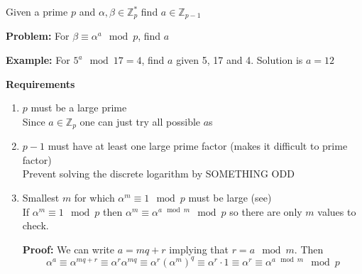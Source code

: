 

Given a prime $p$ and $\alpha, \beta \in \mathbb{Z}_p^*$ find $a \in \mathbb{Z}_{p-1}$

\textbf{Problem:} For $\beta \equiv \alpha^a \mod p$, find $a$

\textbf{Example:} For $5^a \mod 17 = 4$, find $a$ given 5, 17 and 4. Solution is $a = 12$

\textbf{Requirements}
\begin{enumerate}
\item $p$ must be a large prime\\
  Since $a \in \mathbb{Z}_p$ one can just try all possible $a$s

\item $p - 1$ must have at least one large prime factor (makes it difficult to prime factor)\\
  Prevent solving the discrete logarithm by SOMETHING ODD

\item Smallest $m$ for which $\alpha^m \equiv 1 \mod p$ must be large (see)\\
  If $\alpha^m \equiv 1 \mod p$ then $\alpha^m \equiv \alpha^{a \mod m} \mod p$ so there are only $m$ values to check.

  \textbf{Proof:} We can write $a = mq + r$ implying that $r = a \mod m$. Then
  \[ \alpha^a \equiv \alpha^{mq + r} \equiv \alpha^r\alpha^{mq} \equiv \alpha^r(\alpha^m)^q \equiv \alpha^r\cdot 1 \equiv \alpha^r \equiv \alpha^{a \mod m} \mod p\]
\end{enumerate}